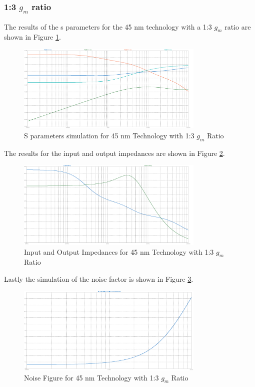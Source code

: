 \subsubsection{1:3 $g_m$ ratio}

The results of the s parameters for the 45 nm technology with a 1:3 $g_m$ ratio are shown in Figure \ref{fig:SParam45nm1to3}. 
\begin{figure}[H]
    \centering
    \includegraphics[width=0.8\textwidth]{Images/SParam_45_1To3.png}
    \caption{S parameters simulation for 45 nm Technology with 1:3 $g_m$ Ratio}
    \label{fig:SParam45nm1to3}
\end{figure}

The results for the input and output impedances are shown in Figure \ref{fig:ZParam45nm1to3}.

\begin{figure}[H]
    \centering
    \includegraphics[width=0.8\textwidth]{Images/Imp_45_1To3.png}
    \caption{Input and Output Impedances for 45 nm Technology with 1:3 $g_m$ Ratio}
    \label{fig:ZParam45nm1to3}
\end{figure}

Lastly the simulation of the noise factor is shown in Figure \ref{fig:Noise45nm1to3}.
\begin{figure}[H]
    \centering
    \includegraphics[width=0.8\textwidth]{Images/Noise_45_1To3.png}
    \caption{Noise Figure for 45 nm Technology with 1:3 $g_m$ Ratio}
    \label{fig:Noise45nm1to3}
\end{figure}

